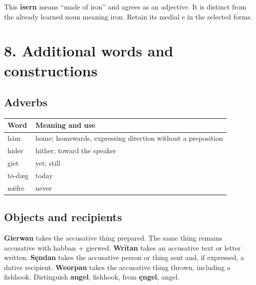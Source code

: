 This \textbf{īsern} means “made of iron” and agrees as an adjective. It is distinct from the already learned noun meaning iron. Retain its medial e in the selected forms.

\section*{8. Additional words and constructions}

\subsection*{Adverbs}

\par\begingroup
\fontsize{10.5}{13.2}\selectfont
\setlength{\LTleft}{0pt}\setlength{\LTright}{\fill}
\noindent
\begin{tabular}{@{}>{\raggedright\arraybackslash}p{28.45mm}>{\raggedright\arraybackslash}p{92.74mm}@{}}
\toprule
\textbf{Word} & \textbf{Meaning and use} \\
\midrule
hām & home; homewards, expressing direction without a preposition \\
hider & hither; toward the speaker \\
gīet & yet; still \\
tō-dæg & today \\
nǣfre & never \\
\bottomrule
\end{tabular}
\par\endgroup

\subsection*{Objects and recipients}

\textbf{Gierwan} takes the accusative thing prepared. The same thing remains accusative with habban + gierwed. \textbf{Wrītan} takes an accusative text or letter written. \textbf{Sęndan} takes the accusative person or thing sent and, if expressed, a dative recipient. \textbf{Weorpan} takes the accusative thing thrown, including a fishhook. Distinguish \textbf{angel}, fishhook, from \textbf{ęngel}, angel.

